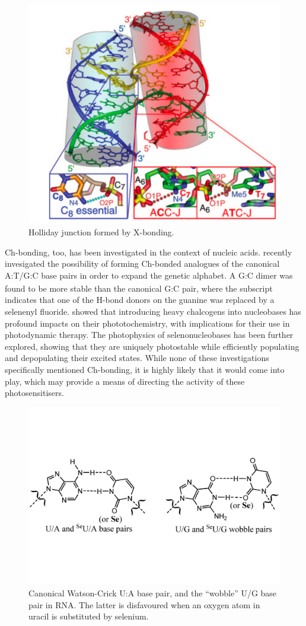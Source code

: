 \begin{refsection}
\begin{figure}
    \centering
    \includegraphics[width=0.6\linewidth]{Figures/holliday-junction.pdf}
    \caption{Holliday junction formed by X-bonding.\autocite{Voth2007}}
    \label{fig:holliday-junction}
\end{figure}

Ch-bonding, too, has been investigated in the context of nucleic acids.
 recently invesigated the possibility of forming Ch-bonded analogues of the canonical A:T/G:C base pairs in order to expand the genetic alphabet.\autocite{Sharma2020}
A G\textsubscript{}:C dimer was found to be more stable than the canonical G:C pair, where the  subscript indicates that one of the H-bond donors on the guanine was replaced by a selenenyl fluoride.
 showed that introducing heavy chalcogens into nucleobases has profound impacts on their phototochemistry, with implications for their use in photodynamic therapy.\autocite{Farrell2018}
The photophysics of selenonucleobases has been further explored, showing that they are uniquely photostable while efficiently populating and depopulating their excited states.\autocite{Mai2019,Peng2020,Fang2019,Uleany2020}
While none of these investigations specifically mentioned Ch-bonding, it is highly likely that it would come into play, which may provide a means of directing the activity of these photosensitisers.

\begin{figure}
    \centering
    \includegraphics[width=0.6\linewidth]{Figures/wobble-bp.pdf}
    \caption[Canonical Watson-Crick U/A base pair, and the ``wobble'' U:G base pair in RNA.]{Canonical Watson-Crick U:A base pair, and the ``wobble'' U/G base pair in RNA. The latter is disfavoured when an oxygen atom in uracil is substituted by selenium.}
    \label{fig:wobble-bp}
\end{figure}


\end{refsection}
